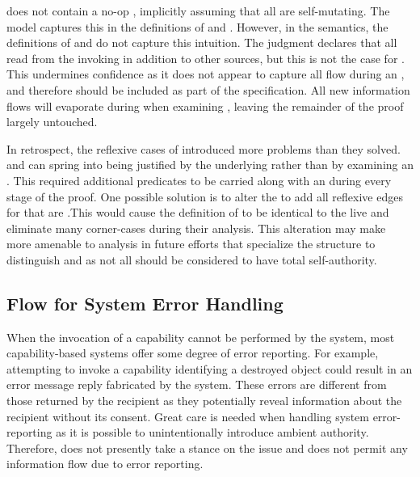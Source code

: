 \xmakefirstuc{\TMmodelName} does not contain a no-op \TMop{}, implicitly assuming that all \TMactive{} \TMobjs{} are self-mutating.
The model captures this in the definitions of \COQmutated{} and \COQmutable{}.
However, in the semantics, the definitions of \COQreadFrom{} and \COQwroteTo{} do not capture this intuition.
The \COQreadFrom{} judgment declares that all \TMops{} read from the invoking \TMobj{} in addition to other sources, but this is not the case for \COQwroteTo{}.
This undermines confidence as it does not appear to capture all flow during an \TMop{}, and therefore should be included as part of the \COQwroteTo{} specification.
All new information flows will evaporate during when examining \COQmutated{}, leaving the remainder of the proof largely untouched.

In retrospect, the reflexive cases of \COQtransfer{} introduced more problems than they solved.
\xmakefirstuc{\TMrefs{}} and \TMaccessEdges{} can spring into being justified by the underlying \TMsystemState{} rather than by examining an \TMaccessGraph{}.
This required additional predicates to be carried along with an \TMaccessGraph{} during every stage of the proof.
One possible solution is to alter the \TMdirAccAG{} to add all reflexive edges for \TMobjs{} that are \TMalive{}.\pagebreak[1]
This would cause the definition of \COQagObjs{} to be identical to the live \TMobjs{} and eliminate many corner-cases during their analysis.
This alteration may make \COQpotTransfer{} more amenable to analysis in future efforts that specialize the \TMaccessGraph{} structure to distinguish \TMactive{} and \TMpassive{} \TMobjs{} as not all \TMobjs{} should be considered to have total self-authority.

\subsection{Flow for System Error Handling}

When the invocation of a capability cannot be performed by the system, most capability-based systems offer some degree of error reporting.
For example, attempting to invoke a capability identifying a destroyed object could result in an error message reply fabricated by the system.
These errors are different from those returned by the recipient as they potentially reveal information about the recipient without its consent.
Great care is needed when handling system error-reporting as it is possible to unintentionally introduce ambient authority.
Therefore, \TMmodelName{} does not presently take a stance on the issue and does not permit any information flow due to error reporting.

